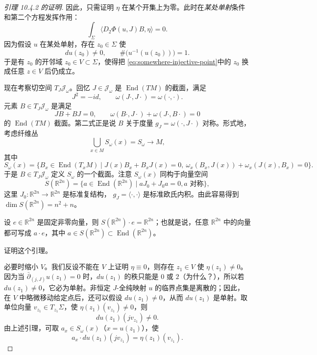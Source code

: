 \begin{proof}[引理 10.4.2 的证明]
因此，只需证明 $\eta$ 在某个开集上为零。此时在\emph{某处单射}条件和第二个方程发挥作用：
\begin{equation}
 \int_\Sigma\langle D_2\Phi(u,J)B,\eta\rangle=0.
 \label{eq:annihilator-structure-repeat}
\end{equation}
因为假设 $u$ 在某处单射，存在 $z_0\in\Sigma$ 使
\begin{equation}
 du(z_0)\ne0,
 \qquad \#\bigl(u^{-1}(u(z_0))\bigr)=1.
 \label{eq:somewhere-injective-point}
\end{equation}
于是有 $z_0$ 的开邻域 $z_0\in V\subset\Sigma$，使得把
\eqref{eq:somewhere-injective-point}中的 $z_0$ 换成任意 $z\in V$ 后仍成立。

现在考察切空间 $T_J\mathcal J_\omega$。回忆 $J\in\mathcal J_\omega$ 是
$\operatorname{End}(TM)$ 的截面，满足
\[
 J^2=-id,
 \qquad \omega(J\cdot,J\cdot)=\omega(\cdot,\cdot).
\]
元素 $B\in T_J\mathcal J_\omega$ 是满足
\[
 JB+BJ=0,
 \qquad \omega(B\cdot,J\cdot)+\omega(J\cdot,B\cdot)=0
\]
的 $\operatorname{End}(TM)$ 截面。第二式正是说 $B$ 关于度量
$g_J=\omega(\cdot,J\cdot)$ 对称。形式地，考虑纤维丛
\[
 \bigcup_{x\in M}S_\omega(x)=S_\omega\longrightarrow M,
\]
其中
\[
 S_\omega(x)=\{B_x\in\operatorname{End}(T_xM)\mid
 J(x)B_x+B_xJ(x)=0,
 \ \omega_x(B_x,J(x))+\omega_x(J(x),B_x)=0\}.
\]
于是 $B\in T_J\mathcal J_\omega$ 定义 $S_\omega$ 的一个截面。注意
$S_\omega(x)$ 同构于向量空间
\[
 S(\mathbb R^{2n})=\{a\in\operatorname{End}(\mathbb R^{2n})\mid
 aJ_0+J_0a=0, a\text{ 对称}\},
\]
这里 $J_0:\mathbb R^{2n}\to\mathbb R^{2n}$ 是标准复结构，
$g_J=\langle\cdot,\cdot\rangle$ 是标准欧氏内积。由此容易得到
$\dim S(\mathbb R^{2n})=n^2+n$。

\begin{lemma}\label{lem:symmetric-antilinear-orbit}
设 $e\in\mathbb R^{2n}$ 是固定非零向量，则
$S(\mathbb R^{2n})\cdot e=\mathbb R^{2n}$；也就是说，任意
$\mathbb R^{2n}$ 中的向量都可写成 $a\cdot e$，其中
$a\in S(\mathbb R^{2n})\subset\operatorname{End}(\mathbb R^{2n})$。
\end{lemma}

\begin{exercise}\label{ex:symmetric-antilinear-orbit}
证明这个引理。
\end{exercise}

必要时缩小 $V$。我们反设不能在 $V$ 上证明 $\eta\equiv0$，则存在
$z_1\in V$ 使 $\eta(z_1)\ne0$。因为当
$\bar\partial_{(j,J)}u(z_1)=0$ 时，$du(z_1)$ 的秩只能是 $0$ 或 $2$（为什么？），所以若
$du(z_1)\ne0$，它必为单射。非恒定 $J$-全纯映射 $u$ 的临界点集是离散的；因此，在 $V$ 中略微移动给定点后，还可以假设
$du(z_1)\ne0$，从而 $du(z_1)$ 是单射。取单位向量
$v_{z_1}\in T_{z_1}\Sigma$，使 $\eta(z_1)(v_{z_1})\ne0$，则
\[
 du(z_1)(jv_{z_1})\ne0.
\]
由上述引理，可取 $a_x\in S_\omega(x)$（$x=u(z_1)$），使
\[
 a_x\cdot du(z_1)(jv_{z_1})=\eta(z_1)(v_{z_1}).
\]


\end{proof}

